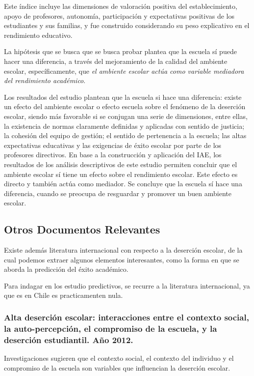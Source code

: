 Este índice incluye las dimensiones de valoración positiva del establecimiento, apoyo de profesores, autonomía, participación y expectativas positivas de los estudiantes y sus familias, y fue construido considerando su peso explicativo en el rendimiento educativo.

La hipótesis que se busca que se busca probar plantea que la escuela sí puede hacer una diferencia, a través del mejoramiento de la calidad del ambiente escolar, específicamente, que \textit{el ambiente escolar actúa como variable mediadora del rendimiento académico}. 

Los resultados del estudio plantean que la escuela si hace una diferencia: existe un efecto del ambiente escolar o efecto escuela sobre el fenómeno de la deserción escolar, siendo más favorable si se conjugan una serie de dimensiones, entre ellas, la existencia de normas claramente definidas y aplicadas con sentido de justicia; la cohesión del equipo de gestión; el sentido de pertenencia a la escuela; las altas expectativas educativas y las exigencias de éxito escolar por parte de los profesores directivos. En base a la construcción y aplicación del IAE, los resultados de los análisis descriptivos de este estudio permiten concluir que el ambiente escolar sí tiene un efecto sobre el rendimiento escolar. Este efecto es directo y también actúa como mediador. Se concluye que la escuela sí hace una diferencia, cuando se preocupa de resguardar y promover un buen ambiente escolar. 

\subsection{Otros Documentos Relevantes}
Existe además literatura internacional con respecto a la deserción escolar, de la cual podemos extraer algunos elementos interesantes, como la forma en que se aborda la predicción del éxito académico. 

Para indagar en los estudio predictivos, se recurre a la literatura internacional, ya que es en Chile es practicamenten nula. 

\subsubsection{Alta deserción escolar: interacciones entre el contexto social, la auto-percepción, el compromiso de la escuela, y la deserción estudiantil. Año 2012.}

Investigaciones sugieren que el contexto social, el contexto del individuo y el compromiso de la escuela son variables que influencian la deserción escolar.

